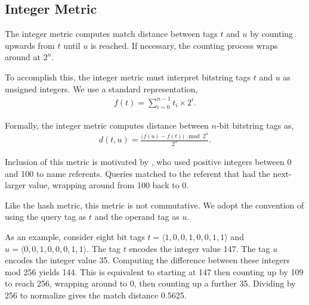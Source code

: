 \subsection{Integer Metric} \label{sec:integer}

The integer metric computes match distance between tags $t$ and $u$ by counting upwards from $t$ until $u$ is reached.
If necessary, the counting process wraps around at $2^n$.

To accomplish this, the integer metric must interpret bitstring tags $t$ and $u$ as unsigned integers.
We use a standard representation,
\begin{align*}
f(t)
= \sum_{i=0}^{n-1} t_i \times 2^i.
\end{align*}

Formally, the integer metric computes distance between $n$-bit bitstring tags as,
\begin{align*}
d(t, u) = \frac{\Big(f(u) - f(t)\Big) \mod 2^n}{2^n}.
\end{align*}

Inclusion of this metric is motivated by \cite{spector2011tag}, who used positive integers between 0 and 100 to name referents.
Queries matched to the referent that had the next-larger value, wrapping around from 100 back to 0.

Like the hash metric, this metric is not commutative.
We adopt the convention of using the query tag as $t$ and the operand tag as $u$.

As an example, consider eight bit tags $t = \langle 1, 0, 0, 1, 0, 0, 1, 1 \rangle$ and $u = \langle 0, 0, 1, 0, 0, 0, 1, 1 \rangle$.
The tag $t$ encodes the integer value 147.
The tag $u$ encodes the integer value 35.
Computing the difference between these integers mod 256 yields 144.
This is equivalent to starting at 147 then counting up by 109 to reach 256, wrapping around to 0, then counting up a further 35.
Dividing by 256 to normalize gives the match distance 0.5625.
